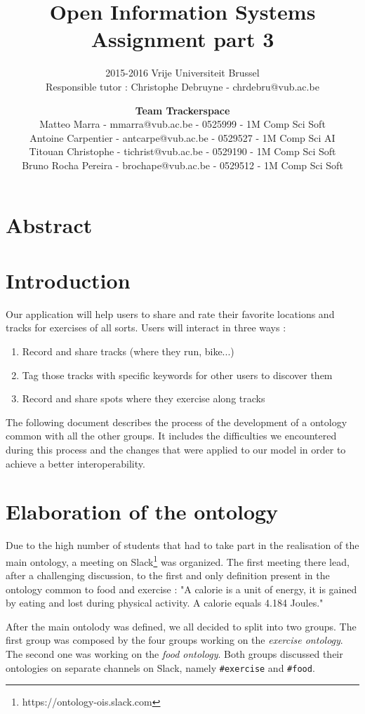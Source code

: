 \documentclass[a4paper]{article}
\title{\textbf{Open Information Systems\\Assignment part 3}}
\subtitle{2015-2016 Vrije Universiteit Brussel\\Responsible tutor : Christophe Debruyne - chrdebru@vub.ac.be}
\author{\textbf{Team Trackerspace}\\Matteo Marra - mmarra@vub.ac.be - 0525999 - 1M Comp Sci Soft\\Antoine Carpentier - antcarpe@vub.ac.be - 0529527 - 1M Comp Sci AI\\Titouan Christophe - tichrist@vub.ac.be - 0529190 - 1M Comp Sci Soft\\Bruno Rocha Pereira - brochape@vub.ac.be - 0529512 - 1M Comp Sci Soft}
\begin{document}
\maketitle

\section{Abstract}
\section{Introduction}

Our application will help users to share and rate their favorite locations and tracks for exercises of all sorts. Users will interact in three ways : 

\begin{enumerate}
    \item Record and share tracks (where they run, bike...)
    \item Tag those tracks with specific keywords for other users to discover them
    \item Record and share spots where they exercise along tracks
\end{enumerate}

The following document describes the process of the development of a ontology common with all the other groups. It includes the difficulties we encountered during this process and the changes that were applied to our model in order to achieve a better interoperability.




\section{Elaboration of the ontology}
Due to the high number of students that had to take part in the realisation of the main ontology, a meeting on Slack\footnote{https://ontology-ois.slack.com} was organized. The first meeting there lead, after a challenging discussion, to the first and only definition present in the ontology common to food and exercise : "A calorie is a unit of energy, it is gained by eating and lost during physical activity. A calorie equals 4.184 Joules." 

After the main ontolody was defined, we all decided to split into two groups. The first group was composed by the four groups working on the \textit{exercise ontology}. The second one was working on the \textit{food ontology}. Both groups discussed their ontologies on separate channels on Slack, namely \texttt{\#exercise} and \texttt{\#food}.
\end{document}
